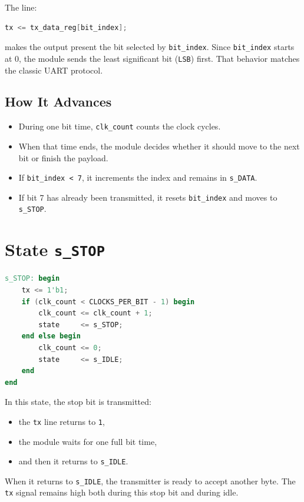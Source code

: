 \documentclass[12pt]{article}
\begin{document}
The line:

\begin{lstlisting}[language=Verilog]
tx <= tx_data_reg[bit_index];
\end{lstlisting}

makes the output present the bit selected by \texttt{bit\_index}. Since \texttt{bit\_index} starts at 0, the module sends the least significant bit (\texttt{LSB}) first. That behavior matches the classic UART protocol.

\subsection*{How It Advances}

\begin{itemize}
    \item During one bit time, \texttt{clk\_count} counts the clock cycles.
    \item When that time ends, the module decides whether it should move to the next bit or finish the payload.
    \item If \texttt{bit\_index < 7}, it increments the index and remains in \texttt{s\_DATA}.
    \item If bit 7 has already been transmitted, it resets \texttt{bit\_index} and moves to \texttt{s\_STOP}.
\end{itemize}

\section{State \texttt{s\_STOP}}

\begin{lstlisting}[language=Verilog]
s_STOP: begin
    tx <= 1'b1;
    if (clk_count < CLOCKS_PER_BIT - 1) begin
        clk_count <= clk_count + 1;
        state     <= s_STOP;
    end else begin
        clk_count <= 0;
        state     <= s_IDLE;
    end
end
\end{lstlisting}

In this state, the stop bit is transmitted:

\begin{itemize}
    \item the \texttt{tx} line returns to \texttt{1},
    \item the module waits for one full bit time,
    \item and then it returns to \texttt{s\_IDLE}.
\end{itemize}

When it returns to \texttt{s\_IDLE}, the transmitter is ready to accept another byte. The \texttt{tx} signal remains high both during this stop bit and during idle.
\end{document}
